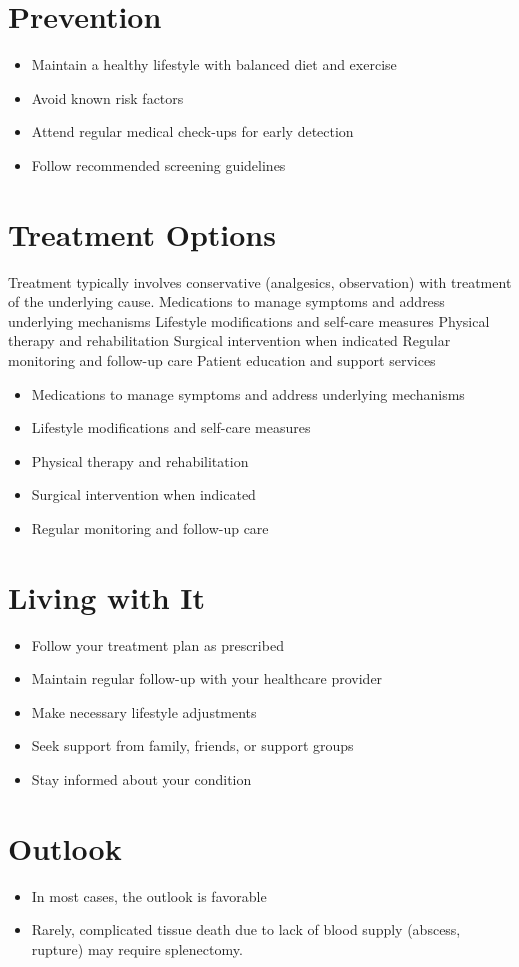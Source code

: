 \section{Prevention}
\begin{itemize}[noitemsep]
  \item Maintain a healthy lifestyle with balanced diet and exercise
  \item Avoid known risk factors
  \item Attend regular medical check-ups for early detection
  \item Follow recommended screening guidelines
\end{itemize}
\section{Treatment Options}
Treatment typically involves conservative (analgesics, observation) with treatment of the underlying cause. Medications to manage symptoms and address underlying mechanisms Lifestyle modifications and self-care measures Physical therapy and rehabilitation Surgical intervention when indicated Regular monitoring and follow-up care Patient education and support services

\begin{itemize}[noitemsep]
  \item Medications to manage symptoms and address underlying mechanisms
  \item Lifestyle modifications and self-care measures
  \item Physical therapy and rehabilitation
  \item Surgical intervention when indicated
  \item Regular monitoring and follow-up care
\end{itemize}
\section{Living with It}
\begin{itemize}[noitemsep]
  \item Follow your treatment plan as prescribed
  \item Maintain regular follow-up with your healthcare provider
  \item Make necessary lifestyle adjustments
  \item Seek support from family, friends, or support groups
  \item Stay informed about your condition
\end{itemize}
\section{Outlook}
\begin{itemize}[noitemsep]
  \item In most cases, the outlook is favorable
  \item Rarely, complicated tissue death due to lack of blood supply (abscess, rupture) may require splenectomy.
\end{itemize}
